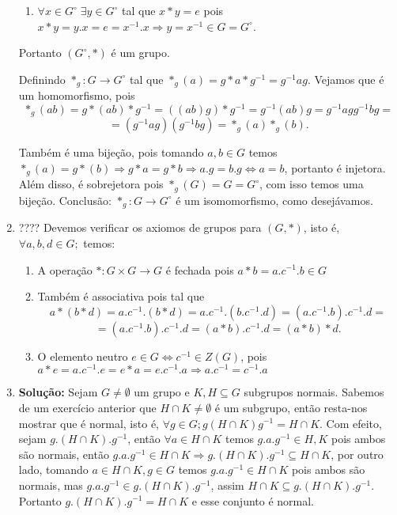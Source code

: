 \documentclass{article}
\begin{document}
\begin{enumerate}
\begin{enumerate}
			\item $\forall x \in G^{\circ} \; \exists y \in G^{\circ}$ tal que $x*y=e$ pois $x*y= y.x = e= x^{-1}.x \Rightarrow y = x^{-1} \in G = G^{\circ}$.
		\end{enumerate}
		Portanto $(G^{\circ}, *)$ é um grupo.
		
		Definindo $*_{g}:G\to G^{\circ}$ tal que $*_{g}(a) = g*a*g^{-1} = g^{-1}ag$. Vejamos que é um homomorfismo, pois 
		$$
		*_{g}(ab) = g*(ab)*g^{-1} = ((ab)g)*g^{-1} = g^{-1}(ab)g = g^{-1}agg^{-1}bg=
		$$ 
		$$
		= (g^{-1}ag)(g^{-1}bg) = *_{g}(a)*_{g}(b).
		$$
		
		Também é uma bijeção, pois tomando $a, b \in G$ temos $*_{g}(a) = g*(b) \Rightarrow g*a = g*b \Rightarrow a.g = b.g \iff a=b$, portanto é injetora. Além disso, é sobrejetora pois $*_{g}(G) = G= G^{\circ}$, com isso temos uma bijeção. Conclusão: $*_{g}:G\to G^{\circ}$ é um isomomorfismo, como desejávamos.
		
		\item ???? Devemos verificar os axiomos de grupos para $(G,*)$, isto é, $\forall a, b, d \in G; $ temos:
		\begin{enumerate}
			\item A operação $*: G \times G \to G$ é fechada pois $a*b = a.c^{-1}.b \in G$
			
			\item Também é associativa pois tal que 
			$$
			a*(b*d) = a.c^{-1}.(b*d) =  a.c^{-1}.(b.c^{-1}.d) = (a.c^{-1}.b).c^{-1}.d =
			$$
			$$
			= (a.c^{-1}.b).c^{-1}.d = (a*b).c^{-1}.d = (a*b)*d.
			$$
			
			\item O elemento neutro $e \in G \iff c^{-1} \in Z(G)$, pois $a*e = a.c^{-1}.e = e*a = e.c^{-1}.a \Rightarrow a.c^{-1}=c^{-1}.a$
			
		\end{enumerate}
		
		\item \textbf{Solução:} Sejam $G \neq \emptyset$ um grupo e $K,H \subseteq G$ subgrupos normais. Sabemos de um exercício anterior que $H \cap K \neq \emptyset$ é um subgrupo, então resta-nos mostrar que é normal, isto é, $\forall g \in G; g(H \cap K)g^{-1} = H \cap K$. Com efeito, sejam $g.(H \cap K ).g^{-1}$, então $\forall a \in H \cap K$ temos $g.a.g^{-1} \in H, K$ pois ambos são normais, então $g.a.g^{-1} \in H \cap K \Rightarrow g.(H \cap K ).g^{-1} \subseteq H \cap K $, por outro lado, tomando $a \in H \cap K, g \in G$ temos $g.a.g^{-1} \in H \cap K$ pois ambos são normais, mas $g.a.g^{-1} \in g.(H \cap K ).g^{-1}$, assim $H \cap K \subseteq g.(H \cap K ).g^{-1}$. Portanto $g.(H \cap K ).g^{-1}= H \cap K$ e esse conjunto é normal.
		

\end{enumerate}
\end{document}

